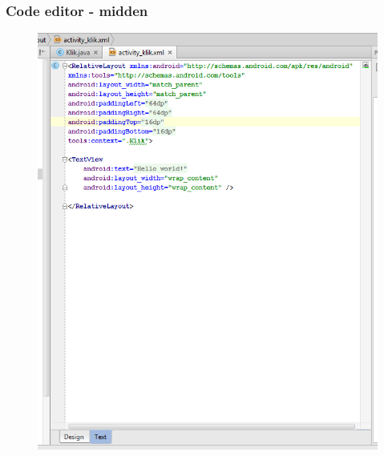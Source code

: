 \documentclass[11pt]{beamer}
\begin{document}
\begin{frame}
\frametitle{Code editor - midden}
\begin{figure}
\centering
\includegraphics[height=.9\textheight]{./asinterface3}
\label{fig:asinterface3}
\end{figure}
\end{frame}
\end{document}
